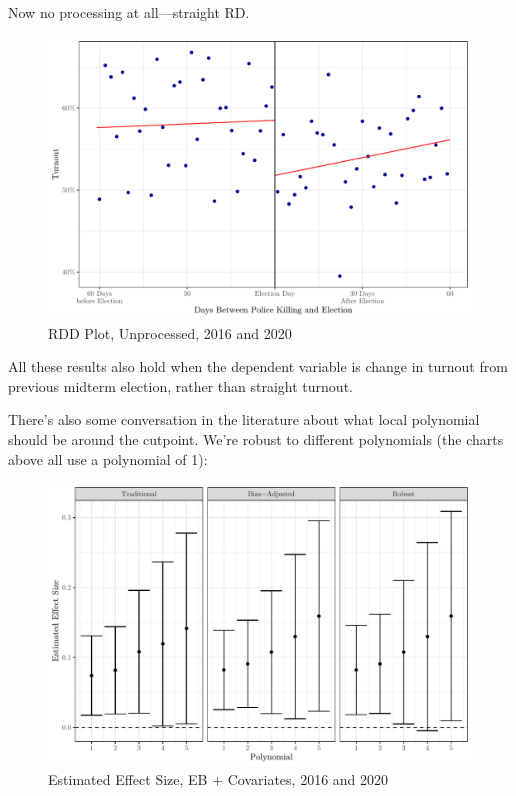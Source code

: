 \documentclass[
  12pt,
]{article}
\begin{document}
Now no processing at all---straight RD.

\begin{figure}[H]

{\centering \includegraphics{shoot_to_files/figure-latex/rd3-chunk-1} 

}

\caption{\label{fig:map}RDD Plot, Unprocessed, 2016 and 2020}\label{fig:rd3-chunk}
\end{figure}

All these results also hold when the dependent variable is change in turnout from previous midterm election, rather than straight turnout.

There's also some conversation in the literature about what local polynomial should be around the cutpoint. We're robust to different polynomials (the charts above all use a polynomial of 1):

\begin{figure}[H]

{\centering \includegraphics{shoot_to_files/figure-latex/polys-chunk-1} 

}

\caption{\label{fig:map}Estimated Effect Size, EB + Covariates, 2016 and 2020}\label{fig:polys-chunk}
\end{figure}
\end{document}
